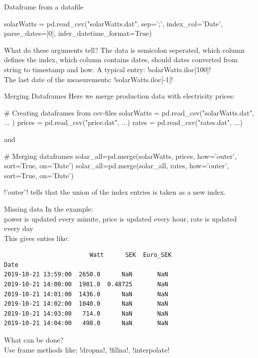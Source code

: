 \documentclass[hyperref={pdfpagelabels=false},table]{beamer}
\begin{document}
\begin{frame}[fragile]{Dataframe from a datafile}
\begin{python}
solarWatts = pd.read_csv("solarWatts.dat",
                         sep=';',
                         index_col='Date',
                         parse_dates=[0],
                         infer_datetime_format=True)
\end{python}
What do these arguments tell?
The data is semicolon seperated, which column defines the index, which column contains dates, should dates converted from string to timestamp and how.
\vfill
A typical entry: \hfill \pyth!solarWatts.iloc[100]!\\
The last date of the measurements: \hfill \pyth!solarWatts.iloc[-1]!
\end{frame}
\begin{frame}[fragile]{Merging Dataframes}
Here we merge production data with electricity prices:
\begin{python}
# Creating dataframes from csv-files
solarWatts = pd.read_csv("solarWatts.dat", ... )
prices     = pd.read_csv("price.dat", ...)
rates      = pd.read_csv("rates.dat", ...)
\end{python}
and
\begin{python}
# Merging dataframes
solar_all=pd.merge(solarWatts, prices, how='outer', sort=True, on='Date')
solar_all=pd.merge(solar_all, rates, how='outer', sort=True, on='Date')
\end{python}
\pyth!'outer'! tells that the union of the index entries is taken as a new index.
\end{frame}
\begin{frame}[fragile]{Missing data}
In the example:\\ power is updated every minute, price is updated every hour, rate is updated every day\\
\vfill
This gives enties like:
\begin{lstlisting}
                        Watt      SEK  Euro_SEK
Date
2019-10-21 13:59:00  2650.0      NaN       NaN
2019-10-21 14:00:00  1901.0  0.48725       NaN
2019-10-21 14:01:00  1436.0      NaN       NaN
2019-10-21 14:02:00  1040.0      NaN       NaN
2019-10-21 14:03:00   714.0      NaN       NaN
2019-10-21 14:04:00   498.0      NaN       NaN
\end{lstlisting}
What can be done? \\ Use frame methods like: \pyth!dropna!, \pyth!fillna!, \pyth!interpolate!
\end{frame}
\end{document}
